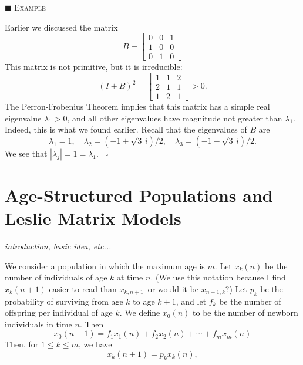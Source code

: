 \documentclass[reqno]{immbook}
\numberwithin{equation}{chapter}
\numberwithin{question}{section}
\numberwithin{theorem}{chapter}
\numberwithin{figure}{chapter}
\theoremstyle{definition}
\newenvironment{xexample}%
{%

\medskip\noindent\addtocounter{example}{1}$\blacksquare$ \textsc{Example \theexample}\hspace*{1em}%
}%
{%
~\hfill$\square$

\medskip
}
\begin{document}
\begin{xexample}
Earlier we discussed the matrix
\begin{equation}
   B = \begin{bmatrix}
             0 & 0 & 1 \\ 1 & 0 & 0 \\ 0 & 1 & 0
       \end{bmatrix}
\end{equation}
This matrix is not primitive, but it is irreducible:
\begin{equation}
  (I+B)^2 = \begin{bmatrix}
                1 & 1 & 2 \\ 2 & 1 & 1 \\ 1 & 2 & 1
            \end{bmatrix}
          > 0.
\end{equation}
The Perron-Frobenius Theorem implies that this matrix
has a simple real eigenvalue $\lambda_1 >0$, and all
other eigenvalues have magnitude not greater than $\lambda_1$.
Indeed, this is what we found earlier.
Recall that
the eigenvalues of $B$ are
\begin{equation}
  \lambda_1 = 1, \quad
  \lambda_2 =  (-1+\sqrt{3}\,i)/2, \quad
  \lambda_3 =  (-1-\sqrt{3}\,i)/2.
\end{equation}
We see that $|\lambda_j| = 1 = \lambda_1$.
\end{xexample}

%
\newpage
%
\section{Age-Structured Populations and Leslie Matrix Models}
\emph{introduction, basic idea, etc...}

We consider a population in which the maximum
age is $m$.
Let $x_{k}(n)$ be the number of individuals
of age $k$ at time $n$.
(We use this notation because
I find $x_{k}(n+1)$
easier to read than $x_{k,n+1}$--or would it be $x_{n+1,k}$?)
Let
$p_k$ be the probability of surviving from age $k$
to age $k+1$,
and let $f_k$ be the number of offspring per individual
of age $k$.
We define $x_0(n)$ to be the number of newborn individuals
in time $n$.
Then
\begin{equation}
  x_{0}(n+1) = f_1 x_{1}(n) + f_2 x_{2}(n) + \cdots + f_m x_{m}(n)
\label{eqn:leslie:newborn}
\end{equation}
Then, for $1 \le k \le m$, we have
\begin{equation}
   x_{k}(n+1) = p_k x_{k}(n),
\label{eqn:leslie:nextgen}
\end{equation}
\end{document}
